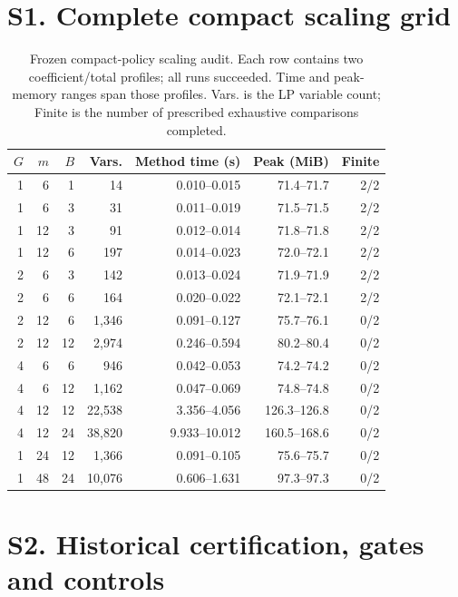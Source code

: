 \section{S1. Complete compact scaling grid}
\begin{table}[htbp]
\centering\small
\caption{Frozen compact-policy scaling audit. Each row contains two coefficient/total profiles; all runs succeeded. Time and peak-memory ranges span those profiles. Vars. is the LP variable count; Finite is the number of prescribed exhaustive comparisons completed.}
\label{tab:compact-scaling-audit}
\begin{tabular}{rrrrrrr}
\hline
$G$ & $m$ & $B$ & Vars. & Method time (s) & Peak (MiB) & Finite \\
\hline
1 & 6 & 1 & 14 & 0.010--0.015 & 71.4--71.7 & 2/2 \\
1 & 6 & 3 & 31 & 0.011--0.019 & 71.5--71.5 & 2/2 \\
1 & 12 & 3 & 91 & 0.012--0.014 & 71.8--71.8 & 2/2 \\
1 & 12 & 6 & 197 & 0.014--0.023 & 72.0--72.1 & 2/2 \\
2 & 6 & 3 & 142 & 0.013--0.024 & 71.9--71.9 & 2/2 \\
2 & 6 & 6 & 164 & 0.020--0.022 & 72.1--72.1 & 2/2 \\
2 & 12 & 6 & 1,346 & 0.091--0.127 & 75.7--76.1 & 0/2 \\
2 & 12 & 12 & 2,974 & 0.246--0.594 & 80.2--80.4 & 0/2 \\
4 & 6 & 6 & 946 & 0.042--0.053 & 74.2--74.2 & 0/2 \\
4 & 6 & 12 & 1,162 & 0.047--0.069 & 74.8--74.8 & 0/2 \\
4 & 12 & 12 & 22,538 & 3.356--4.056 & 126.3--126.8 & 0/2 \\
4 & 12 & 24 & 38,820 & 9.933--10.012 & 160.5--168.6 & 0/2 \\
1 & 24 & 12 & 1,366 & 0.091--0.105 & 75.6--75.7 & 0/2 \\
1 & 48 & 24 & 10,076 & 0.606--1.631 & 97.3--97.3 & 0/2 \\
\hline
\end{tabular}
\end{table}
\FloatBarrier
\section{S2. Historical certification, gates and controls}
